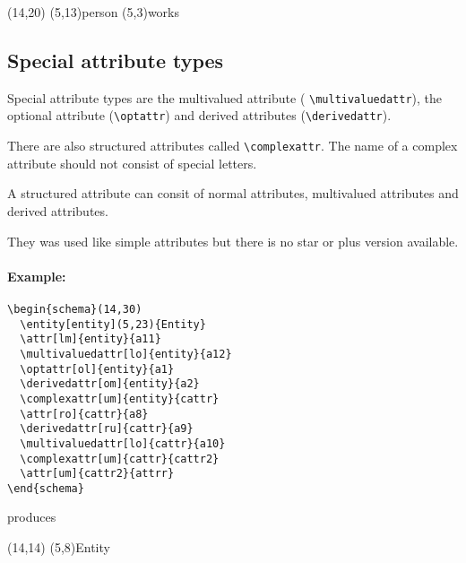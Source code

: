 \documentclass[a4paper,11pt]{article}
\begin{document}
\begin{schema}(14,20)
  \entity[Person](5,13){person}
  \relation[arbeitet](5,3){works}
\end{schema}

\subsection{Special attribute types}

Special attribute types are the multivalued attribute ( \verb|\multivaluedattr|),
the optional attribute (\verb|\optattr|) and derived attributes (\verb|\derivedattr|).

There are also structured attributes called \verb|\complexattr|. 
The name of a complex attribute should not consist of special letters.

A structured attribute can consit of normal attributes, multivalued attributes 
and derived attributes.

They was used like simple attributes but there is no star or plus version available.

\paragraph{Example:}

\begin{verbatim}
\begin{schema}(14,30)
  \entity[entity](5,23){Entity}
  \attr[lm]{entity}{a11}
  \multivaluedattr[lo]{entity}{a12}
  \optattr[ol]{entity}{a1}
  \derivedattr[om]{entity}{a2}
  \complexattr[um]{entity}{cattr}
  \attr[ro]{cattr}{a8}
  \derivedattr[ru]{cattr}{a9}
  \multivaluedattr[lo]{cattr}{a10}
  \complexattr[um]{cattr}{cattr2}
  \attr[um]{cattr2}{attrr}
\end{schema}
\end{verbatim}

produces

\begin{schema}(14,14)
  \entity[entity](5,8){Entity}
\end{schema}
\end{document}
